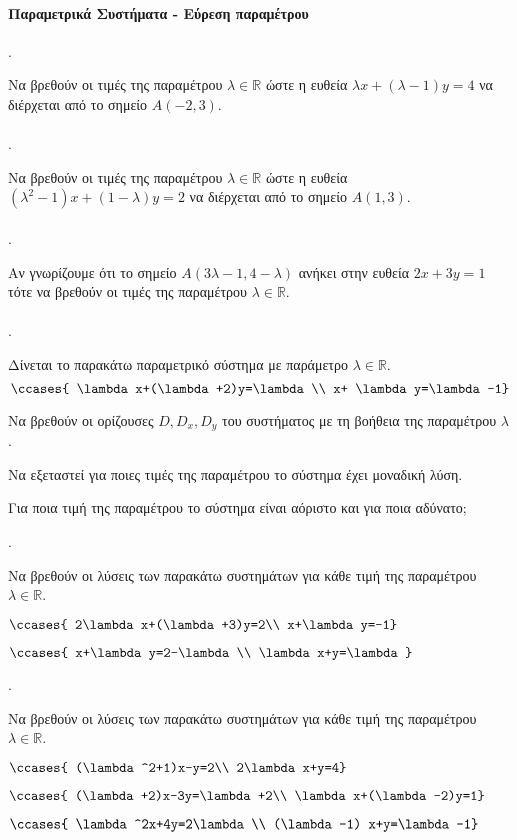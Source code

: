 \documentclass[11pt,a4paper,twocolumn]{article}
\newcounter{askhsh}
\newcommand{\askhsh}{\large\theaskhsh.\ \addtocounter{askhsh}{1}}
\begin{document}
\paragraph{Παραμετρικά Συστήματα - Εύρεση παραμέτρου}
\askhsh Να βρεθούν οι τιμές της παραμέτρου $ \lambda\in\mathbb{R} $ ώστε η ευθεία $ \lambda x+(\lambda-1)y=4 $ να διέρχεται από το σημείο $ A(-2,3) $.\\\\
\askhsh Να βρεθούν οι τιμές της παραμέτρου $ \lambda\in\mathbb{R} $ ώστε η ευθεία $ (\lambda^2-1)x+(1-\lambda)y=2 $ να διέρχεται από το σημείο $ A(1,3) $.\\\\
\askhsh Αν γνωρίζουμε ότι το σημείο $ A(3\lambda-1,4-\lambda) $ ανήκει στην ευθεία $ 2x+3y=1 $ τότε να βρεθούν οι τιμές της παραμέτρου $ \lambda\in\mathbb{R} $.\\\\
\askhsh Δίνεται το παρακάτω παραμετρικό σύστημα με παράμετρο $ \lambda\in\mathbb{R} $.
\[ \ccases{
\lambda x+(\lambda+2)y=\lambda\\
x+ \lambda y=\lambda-1} \]
\begin{alist}
\item Να βρεθούν οι ορίζουσες $ D,D_x,D_y $ του συστήματος με τη βοήθεια της παραμέτρου $ \lambda $.
\item Να εξεταστεί για ποιες τιμές της παραμέτρου το σύστημα έχει μοναδική λύση.
\item Για ποια τιμή της παραμέτρου το σύστημα είναι αόριστο και για ποια αδύνατο;
\end{alist}
\askhsh Να βρεθούν οι λύσεις των παρακάτω συστημάτων για κάθε τιμή της παραμέτρου $ \lambda\in\mathbb{R} $.
\begin{alist}
\item $\ccases{
2\lambda x+(\lambda+3)y=2\\
x+\lambda y=-1}$
\item $\ccases{
x+\lambda y=2-\lambda\\
\lambda x+y=\lambda}$
\end{alist}
\askhsh Να βρεθούν οι λύσεις των παρακάτω συστημάτων για κάθε τιμή της παραμέτρου $ \lambda\in\mathbb{R} $.
\begin{alist}
\item $\ccases{
(\lambda^2+1)x-y=2\\
2\lambda x+y=4}$
\item $\ccases{
(\lambda+2)x-3y=\lambda+2\\
\lambda x+(\lambda-2)y=1}$
\item $\ccases{
\lambda^2x+4y=2\lambda\\
(\lambda-1) x+y=\lambda-1}$
\end{alist}
\end{document}
